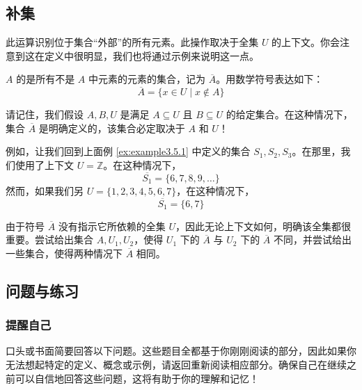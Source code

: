 \subsection{补集}

此运算识别位于集合``外部''的所有元素。此操作取决于全集 $U$ 的上下文。你会注意到这在定义中很明显，我们也将通过示例来说明这一点。

\begin{definition}
    $A$ 的是所有不是 $A$ 中元素的元素的集合，记为 $\overline{A}$。用数学符号表达如下：
    \[\overline{A} = \{x \in U \mid x \notin A\}\]
\end{definition}

请记住，我们假设 $A,B,U$ 是满足 $A \subseteq U$ 且 $B \subseteq U$ 的给定集合。在这种情况下，集合 $\overline{A}$ 是明确定义的，该集合必定取决于 $A$ 和 $U$！

\begin{example}
    例如，让我们回到上面例 \ref{ex:example3.5.1} 中定义的集合 $S_1, S_2, S_3$。在那里，我们使用了上下文 $U = \mathbb{Z}$。在这种情况下，
    \[\overline{S_1} = \{6, 7, 8, 9, \dots \}\]
    然而，如果我们另 $U = \{1, 2, 3, 4, 5, 6, 7\}$，在这种情况下，
    \[\overline{S_1} = \{6, 7\}\]
\end{example}

由于符号 $\overline{A}$ 没有指示它所依赖的全集 $U$，因此无论上下文如何，明确该全集都很重要。尝试给出集合 $A, U_1, U_2$，使得 $U_1$ 下的 $\overline{A}$ 与 $U_2$ 下的 $\overline{A}$ 不同，并尝试给出一些集合，使得两种情况下 $\overline{A}$ 相同。

\subsection{问题与练习}

\subsubsection*{提醒自己}

口头或书面简要回答以下问题。这些题目全都基于你刚刚阅读的部分，因此如果你无法想起特定的定义、概念或示例，请返回重新阅读相应部分。确保自己在继续之前可以自信地回答这些问题，这将有助于你的理解和记忆！

